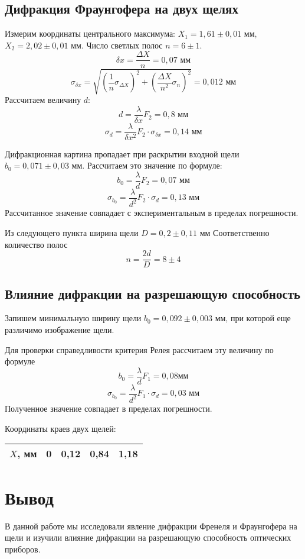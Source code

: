 	\subsection{Дифракция Фраунгофера на двух щелях}
	
	Измерим координаты центрального максимума: $X_1 = 1,61\pm 0,01$ мм, $X_2 = 2,02\pm 0,01$ мм. Число светлых полос $n = 6\pm1$.
	\[
		\delta x = \frac{\Delta X}{n} = 0,07 \text{ мм}
	\]
	\[
		\sigma_{\delta x} = \sqrt{\left(\frac{1}{n}\sigma_{\Delta X}\right)^2+\left(\frac{\Delta X}{n^2}\sigma_n\right)^2} = 0,012\text{ мм}
	\]
	Рассчитаем величину $d$:
	\[
		d =\frac{\lambda}{\delta x}F_2 = 0,8 \text{ мм}
	\]
	\[
	\sigma_d = \frac{\lambda}{\delta x^2}F_2\cdot \sigma_{\delta x} = 0,14 \text{ мм}
	\]
	
	Дифракционная картина пропадает при раскрытии входной щели $b_0 = 0,071\pm0,03$ мм. Рассчитаем это значение по формуле:
	\[
		b_0 =\frac{\lambda}{d}F_2 = 0,07 \text{ мм}
	\]
	\[
	\sigma_{b_0} = \frac{\lambda}{d^2}F_2\cdot \sigma_{d} = 0,13 \text{ мм}
	\]
	Рассчитанное значение совпадает с экспериментальным в пределах погрешности.
	
	Из следующего пункта ширина щели $D = 0,2 \pm 0,11$ мм
	Соответственно количество полос
	\[
		n = \frac{2d}{D} = 8\pm4
	\]
	
	\subsection{Влияние дифракции на разрешающую способность}
	
	Запишем минимальную ширину щели $b_0 = 0,092\pm 0,003$ мм, при которой еще различимо изображение щели.
	
	Для проверки справедливости критерия Релея рассчитаем эту величину по формуле
	\[
		b_0 = \frac{\lambda}{d}F_1 = 0,08 \text{мм}
	\]
	\[
	\sigma_{b_0} = \frac{\lambda}{d^2}F_1\cdot \sigma_{d} = 0,03 \text{ мм}
	\]
	Полученное значение совпадает в пределах погрешности.
	
	Координаты краев двух щелей:
	\begin{table}[H]
		\centering
		\begin{tabular}{|l|l|l|l|l|}
			\hline
			$X$, мм & 0 & 0,12 & 0,84 & 1,18 \\ \hline
		\end{tabular}
	\end{table}

	\section{Вывод}
	В данной работе мы исследовали явление дифракции Френеля и Фраунгофера на щели и изучили влияние дифракции на разрешающую способность оптических приборов. 















 





	

